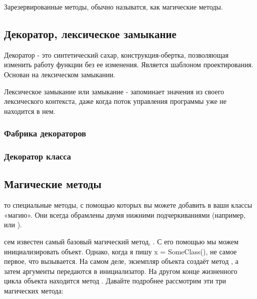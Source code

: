 Зарезервированные методы, обычно называтся, как магические методы.

\subsection{Декоратор, лексическое замыкание}

Декоратор - это синтетический сахар, конструкция-обертка, позволяющая изменить работу функции без ее изменения. Является шаблоном проектирования. Основан на лексическом замыкании.

Лексическое замыкание или замыкание - запоминает значения из своего лексического контекста, даже когда поток управления программы уже не находится в нем. 

\subsubsection{Фабрика декораторов}

\subsubsection{Декоратор класса}

\subsection{Магические методы}	

то специальные методы, с помощью которых вы можете добавить в ваши классы «магию». Они всегда обрамлены двумя нижними подчеркиваниями (например,  или ). 

сем известен самый базовый магический метод, . С его помощью мы можем инициализировать объект. Однако, когда я пишу x = SomeClass(),  не самое первое, что вызывается. На самом деле, экземпляр объекта создаёт метод , а затем аргументы передаются в инициализатор. На другом конце жизненного цикла объекта находится метод . Давайте подробнее рассмотрим эти три магических метода:

